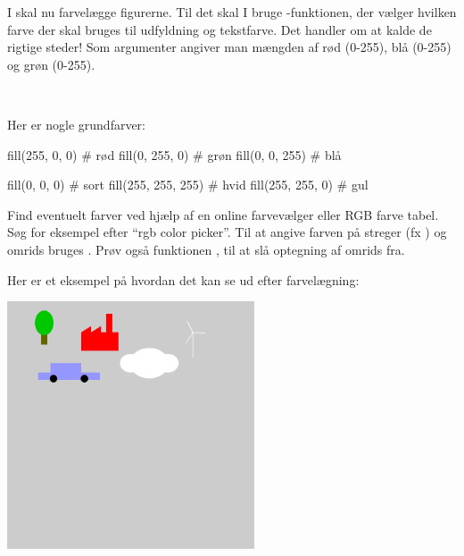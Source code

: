 \documentclass{ucph-handout}
\begin{document}
\begin{exercisebox}[adjusted title=Farver]
I skal nu farvelægge figurerne. Til det skal I bruge
-funktionen, der vælger hvilken farve der skal
bruges til udfyldning og tekstfarve. Det handler om at kalde
 de rigtige steder! Som argumenter angiver man mængden
af rød (0-255), blå (0-255) og grøn (0-255).

~

\noindent
Her er nogle grundfarver:

\begin{minipage}{0.45\linewidth}
\begin{python}
fill(255, 0, 0)  # rød
fill(0, 255, 0)  # grøn
fill(0, 0, 255)  # blå
\end{python}
\end{minipage}
\begin{minipage}{0.45\linewidth}
\begin{python}
fill(0, 0, 0)       # sort
fill(255, 255, 255) # hvid
fill(255, 255, 0)   # gul
\end{python}
\end{minipage}

\noindent
Find eventuelt farver ved hjælp af en online farvevælger eller RGB
farve tabel. Søg for eksempel efter ``rgb color picker''.
Til at angive farven på streger (fx ) og omrids
bruges . Prøv også funktionen ,
til at slå optegning af omrids fra.
\end{exercisebox}

\newpage
\begin{exercisebox}[adjusted title=Eksempel]
\noindent
Her er et eksempel på hvordan det kan se ud efter farvelægning:
\begin{center}
\includegraphics[width=0.55\textwidth]{illustrationer/farvelagt.png}
\end{center}
\end{exercisebox}
\end{document}
